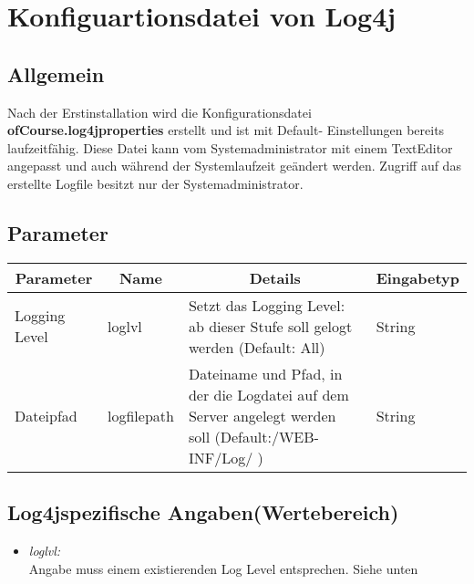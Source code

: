 \section{Konfiguartionsdatei von Log4j}	

\subsection{Allgemein}

Nach der Erstinstallation wird die Konfigurationsdatei \textbf{ofCourse.log4jproperties} erstellt und ist mit Default- Einstellungen bereits laufzeitfähig. Diese Datei kann vom Systemadministrator mit einem TextEditor angepasst und auch während der Systemlaufzeit geändert werden. Zugriff auf das erstellte Logfile besitzt nur der Systemadministrator.

\subsection{Parameter}

\begin{center}
	\begin{longtable}{|p{4cm} | p{3cm}| p{7cm} | p{2cm} |}
	\hline
	\multicolumn{1}{|c|}{\textbf{Parameter}} & \multicolumn{1}{c|}{\textbf{Name}} & \multicolumn{1}{c|}{\textbf{Details}} & \multicolumn{1}{c|}{\textbf{Eingabetyp}}
	\\ \hline
	Logging Level & loglvl & Setzt das Logging Level: ab dieser Stufe soll gelogt werden (Default: All) & String \\ \hline
	Dateipfad & logfilepath & Dateiname und Pfad, in der die Logdatei auf dem Server angelegt werden soll (Default:/WEB-INF/Log/ ) & String \\ \hline
	
\end{longtable}

\end{center}

\subsection{Log4jspezifische Angaben(Wertebereich)}

\begin{itemize}
	\item \emph{loglvl:}\\
	Angabe muss einem existierenden Log Level entsprechen. Siehe unten
\end{itemize}

